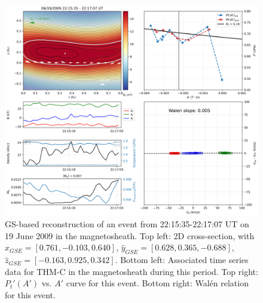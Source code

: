 \begin{figure}
    \centering
    \includegraphics[width=\textwidth]{Figures/Reconstructions/timeseries_walenTest_20090619_20090621.png}
    \caption[GS-based event reconstruction for 19 June 2009]{GS-based reconstruction of an event from 22:15:35-22:17:07 UT on 19 June 2009 in the magnetosheath. Top left: 2D cross-section, with $\hat{x}_{GSE}=[0.761, -0.103, 0.640]$, $\hat{y}_{GSE}=[0.628, 0.365, -0.688]$, $\hat{z}_{GSE}=[-0.163,0.925,0.342]$. Bottom left: Associated time series data for THM-C in the magnetosheath during this period. Top right: $P_t'(A')$ vs. $A'$ curve for this event. Bottom right: Wal\'en relation for this event.}
    \label{fig:reconstruction-June2009}
\end{figure}


